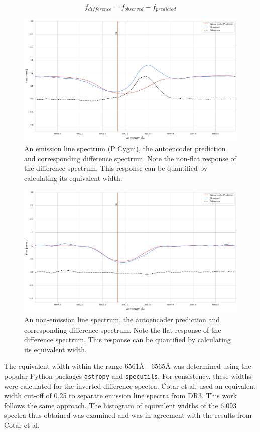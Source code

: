 \begin{equation}
   f_{difference} = f_{observed} - f_{predicted}
\end{equation}

\begin{figure}[!htb]
\centering
\includegraphics[scale=0.45]{figures/normal difference.png}
\caption{An emission line spectrum (P Cygni), the autoencoder prediction and corresponding difference spectrum. Note the non-flat response of the difference spectrum. This response can be quantified by calculating its equivalent width.}
\end{figure}

\begin{figure}[!htb]
\centering
\includegraphics[scale=0.45]{figures/non emission difference.png}
\caption{An non-emission line spectrum, the autoencoder prediction and corresponding difference spectrum. Note the flat response of the difference spectrum. This response can be quantified by calculating its equivalent width.}
\end{figure}

The equivalent width within the range 6561\r{A} - 6565\r{A} was determined using the popular Python packages \texttt{astropy}\cite{astropy:2018}\cite{astropy:2013} and \texttt{specutils}\cite{specutils}. For consistency, these widths were calculated for the inverted difference spectra. Čotar et al. used an equivalent width cut-off of 0.25 to separate emission line spectra from DR3. This work follows the same approach. The histogram of equivalent widths of the 6,093 spectra thus obtained was examined and was in agreement with the results from Čotar et al. 

